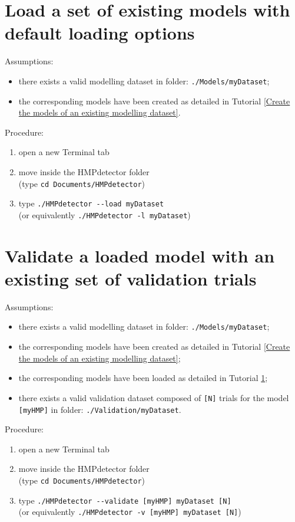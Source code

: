 \documentclass[10pt,a4paper]{report}
\begin{document}
\section{Load a set of existing models with default loading options}
\label{Load a set of existing models with default loading options}
Assumptions:
\begin{itemize}
\item there exists a valid modelling dataset in folder: \verb+./Models/myDataset+;
\item the corresponding models have been created as detailed in Tutorial \ref{Create the models of an existing modelling dataset}.
\end{itemize}
Procedure:
\begin{enumerate}
\item open a new Terminal tab
\item move inside the HMPdetector folder\\
(type \verb+cd Documents/HMPdetector+)
\item type \verb+./HMPdetector --load myDataset+\\
(or equivalently \verb+./HMPdetector -l myDataset+)
\end{enumerate}

\section{Validate a loaded model with an existing set of validation trials}
Assumptions:
\begin{itemize}
\item there exists a valid modelling dataset in folder: \verb+./Models/myDataset+;
\item the corresponding models have been created as detailed in Tutorial \ref{Create the models of an existing modelling dataset};
\item the corresponding models have been loaded as detailed in Tutorial \ref{Load a set of existing models with default loading options};
\item there exists a valid validation dataset composed of \verb+[N]+ trials for the model \verb+[myHMP]+ in folder: \verb+./Validation/myDataset+.
\end{itemize}
Procedure:
\begin{enumerate}
\item open a new Terminal tab
\item move inside the HMPdetector folder\\
(type \verb+cd Documents/HMPdetector+)
\item type \verb+./HMPdetector --validate [myHMP] myDataset [N]+\\
(or equivalently \verb+./HMPdetector -v [myHMP] myDataset [N]+)
\end{enumerate}
\end{document}
